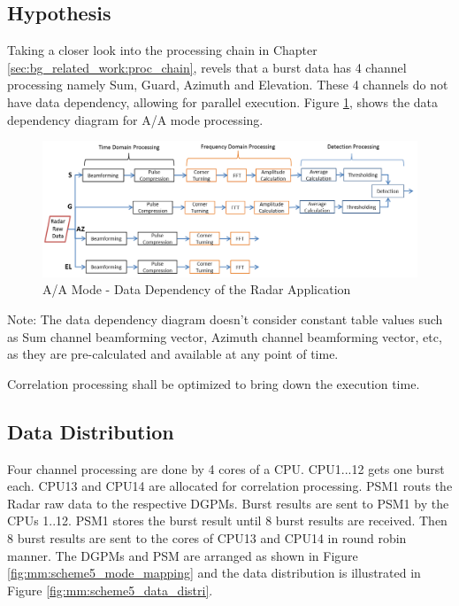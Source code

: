 \subsection{Hypothesis}
\begin{compactitem}

\item Taking a closer look into the processing chain in Chapter \ref{sec:bg_related_work:proc_chain}, revels that a burst data has 4 channel processing namely Sum, Guard, Azimuth and Elevation.  These 4 channels do not have data dependency, allowing for parallel execution. Figure \ref{fig:mm:scheme5_data_path}, shows the data dependency diagram for A/A mode processing.

\begin{figure}[h!]
	\centering
	\includegraphics[width=160mm]{figures/scheme5_data_path}
	\caption{A/A Mode - Data Dependency of the Radar Application}
	\label{fig:mm:scheme5_data_path}
\end{figure}
Note: The data dependency diagram doesn't consider constant table values such as Sum channel beamforming vector, Azimuth channel beamforming vector, etc, as they are pre-calculated and available at any point of time.

\item Correlation processing shall be optimized to bring down the execution time.
\end{compactitem}

\subsection{Data Distribution}
\label{ss:mm:scheme5:data_distribution}
Four channel processing are done by 4 cores of a CPU. CPU1...12 gets one burst each. CPU13 and CPU14 are allocated for correlation processing. 
PSM1 routs the Radar raw data to the respective DGPMs. Burst results are sent to PSM1 by the CPUs 1..12. PSM1 stores the burst result until 8 burst results are received. Then 8 burst results are sent to the cores of CPU13 and CPU14 in round robin manner. The DGPMs and PSM are arranged as shown in Figure \ref{fig:mm:scheme5_mode_mapping} and the data distribution is illustrated in Figure \ref{fig:mm:scheme5_data_distri}.

